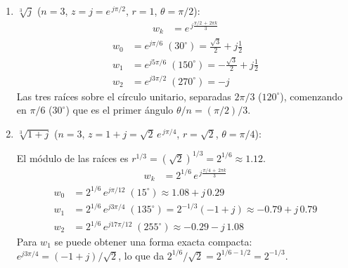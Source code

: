 \documentclass[10pt,a4paper]{article}
\begin{document}
\begin{enumerate}[label=\textbf{\alph*)}]
	\item \textbf{$\sqrt[3]{j}$} ($n=3$, $z = j = e^{\,j\pi/2}$, $r=1$, $\theta=\pi/2$):
	\begin{align*}
		w_k &= e^{\,j\frac{\pi/2\,+\,2\pi k}{3}}
	\end{align*}
	\begin{align*}
		w_0 &= e^{j\pi/6} \;(30^\circ)  = \tfrac{\sqrt{3}}{2} + j\tfrac{1}{2} \\
		w_1 &= e^{j5\pi/6} \;(150^\circ) = -\tfrac{\sqrt{3}}{2} + j\tfrac{1}{2} \\
		w_2 &= e^{j3\pi/2} \;(270^\circ) = -j
	\end{align*}
	Las tres raíces sobre el círculo unitario, separadas $2\pi/3$ ($120^\circ$), comenzando en $\pi/6$ ($30^\circ$) que es el primer ángulo $\theta/n = (\pi/2)/3$.

	\item \textbf{$\sqrt[3]{1+j}$} ($n=3$, $z = 1+j = \sqrt{2}\,e^{\,j\pi/4}$, $r=\sqrt{2}$, $\theta=\pi/4$):

	El módulo de las raíces es $r^{1/3} = (\sqrt{2})^{1/3} = 2^{1/6} \approx 1.12$.
	\begin{align*}
		w_k &= 2^{1/6}\, e^{\,j\frac{\pi/4\,+\,2\pi k}{3}}
	\end{align*}
	\begin{align*}
		w_0 &= 2^{1/6}\, e^{j\pi/12}    \;(15^\circ)  \approx 1.08 + j\,0.29 \\
		w_1 &= 2^{1/6}\, e^{j3\pi/4}    \;(135^\circ) = 2^{-1/3}(-1+j) \approx -0.79 + j\,0.79 \\
		w_2 &= 2^{1/6}\, e^{j17\pi/12}  \;(255^\circ) \approx -0.29 - j\,1.08
	\end{align*}
	Para $w_1$ se puede obtener una forma exacta compacta: $e^{j3\pi/4} = (-1+j)/\sqrt{2}$, lo que da $2^{1/6}/\sqrt{2} = 2^{1/6-1/2} = 2^{-1/3}$.

\end{enumerate}
\end{document}
